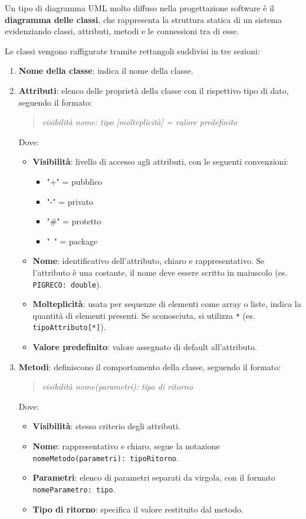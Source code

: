 Un tipo di diagramma UML molto diffuso nella progettazione software è il \textbf{diagramma delle classi}, che rappresenta la struttura statica di un sistema evidenziando classi, attributi, metodi e le connessioni tra di esse.

Le classi vengono raffigurate tramite rettangoli suddivisi in tre sezioni:

\begin{enumerate}
    \item \textbf{Nome della classe}: indica il nome della classe.
    \item \textbf{Attributi}: elenco delle proprietà della classe con il rispettivo tipo di dato, seguendo il formato: 
    \begin{quote}
        \textit{visibilità nome: tipo [molteplicità] = valore predefinito}
    \end{quote}
    Dove:
    \begin{itemize}
        \item \textbf{Visibilità}: livello di accesso agli attributi, con le seguenti convenzioni:
        \begin{itemize}
            \item "+" = pubblico
            \item "-" = privato
            \item "\#" = protetto
            \item "~" = package
        \end{itemize}
        \item \textbf{Nome}: identificativo dell'attributo, chiaro e rappresentativo. Se l'attributo è una costante, il nome deve essere scritto in maiuscolo (es. \texttt{PIGRECO: double}).
        \item \textbf{Molteplicità}: usata per sequenze di elementi come array o liste, indica la quantità di elementi presenti. Se sconosciuta, si utilizza \texttt{*} (es. \texttt{tipoAttributo[*]}).
        \item \textbf{Valore predefinito}: valore assegnato di default all'attributo.
    \end{itemize}
    \item \textbf{Metodi}: definiscono il comportamento della classe, seguendo il formato:
    \begin{quote}
        \textit{visibilità nome(parametri): tipo di ritorno}
    \end{quote}
    Dove:
    \begin{itemize}
        \item \textbf{Visibilità}: stesso criterio degli attributi.
        \item \textbf{Nome}: rappresentativo e chiaro, segue la notazione \texttt{nomeMetodo(parametri): tipoRitorno}.
        \item \textbf{Parametri}: elenco di parametri separati da virgola, con il formato \texttt{nomeParametro: tipo}.
        \item \textbf{Tipo di ritorno}: specifica il valore restituito dal metodo.
    \end{itemize}
\end{enumerate}

